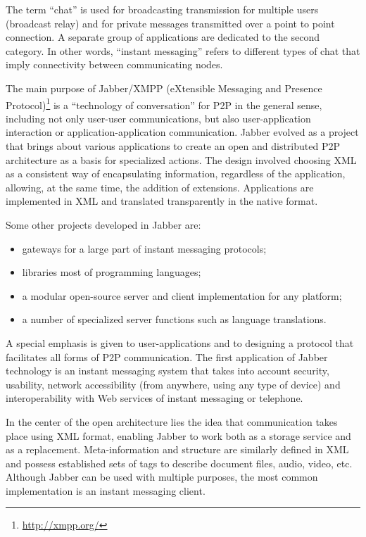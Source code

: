 The term ``chat'' is used for broadcasting transmission for
multiple users (broadcast relay) and for private messages transmitted over a
point to point connection. A separate group of applications are dedicated to
the second category. In other words, ``instant messaging'' refers to different
types of chat that imply connectivity between communicating nodes.

The main purpose of Jabber/XMPP (eXtensible Messaging and Presence
Protocol)\footnote{\url{http://xmpp.org/}}
is a ``technology of conversation'' for P2P in the general sense, including
not only user-user communications, but also user-application interaction or
application-application communication. Jabber evolved as a project that brings about various
applications to create an open and distributed P2P architecture as a basis for
specialized actions. The design involved choosing XML as a consistent way of
encapsulating information, regardless of the application, allowing, at the
same time, the
addition of extensions. Applications are implemented in XML and translated
transparently in the native format.

Some other projects developed in Jabber are:
\begin{itemize}
  \item gateways for a large part of instant messaging protocols;
  \item libraries most of programming languages;
  \item a modular open-source server and client implementation for any platform;
  \item a number of specialized server functions such as language translations.
\end{itemize}

A special emphasis is given to user-applications and to designing a protocol
that facilitates all forms of P2P communication. The first application of Jabber
technology is an instant messaging system that takes into account security,
usability, network accessibility (from anywhere, using any type of device) and
interoperability with Web services of instant messaging or telephone.

In the center of the open architecture lies the idea that communication takes
place using XML format, enabling Jabber to work both as a storage service and
as a replacement. Meta-information and structure are similarly defined in XML
and possess established sets of tags to describe document files, audio, video,
etc. Although Jabber can be used with multiple purposes, the most common
implementation is an instant messaging client.

